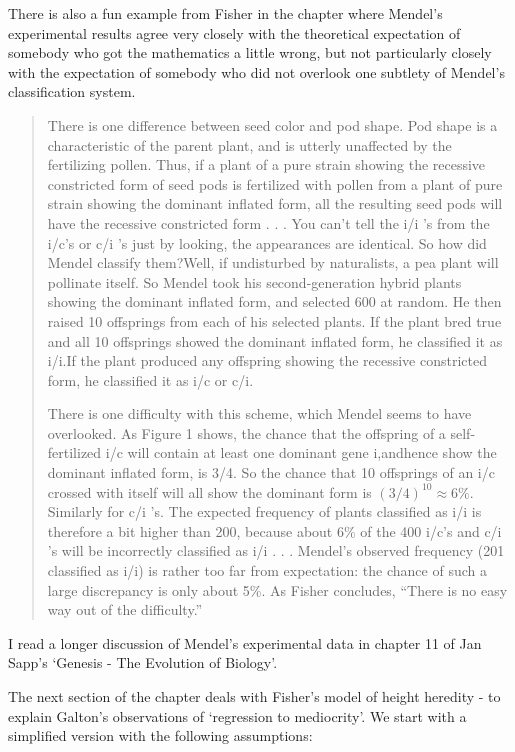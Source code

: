 \documentclass[
]{book}
\begin{document}
There is also a fun example from Fisher in the chapter where Mendel's experimental results agree very closely with the theoretical expectation of somebody who got the mathematics a little wrong, but not particularly closely with the expectation of somebody who did not overlook one subtlety of Mendel's classification system.

\begin{quote}
There is one difference between seed color and pod shape. Pod shape is a characteristic of the parent plant, and is utterly unaffected by the fertilizing pollen. Thus, if a plant of a pure strain showing the recessive constricted form of seed pods is fertilized with pollen from a plant of pure strain showing the dominant inflated form, all the resulting seed pods will have the recessive constricted form . . . You can't tell the i/i 's from the i/c's or c/i 's just by looking, the appearances are identical. So how did Mendel classify them?Well, if undisturbed by naturalists, a pea plant will pollinate itself. So Mendel took his second-generation hybrid plants showing the dominant inflated form, and selected 600 at random. He then raised 10 offsprings from each of his selected plants. If the plant bred true and all 10 offsprings showed the dominant inflated form, he classified it as i/i.If the plant produced any offspring showing the recessive constricted form, he classified it as i/c or c/i.

There is one difficulty with this scheme, which Mendel seems to have overlooked. As Figure 1 shows, the chance that the offspring of a self-fertilized i/c will contain at least one dominant gene i,andhence show the dominant inflated form, is 3/4. So the chance that 10 offsprings of an i/c crossed with itself will all show the dominant form is \((3/4)^{10} \approx 6\%\). Similarly for c/i 's. The expected frequency of plants classified as i/i is therefore a bit higher than 200, because about 6\% of the 400 i/c's and c/i 's will be incorrectly classified as i/i . . . Mendel's observed frequency (201 classified as i/i) is rather too far from expectation: the chance of such a large discrepancy is only about 5\%. As Fisher concludes, ``There is no easy way out of the difficulty.''
\end{quote}

I read a longer discussion of Mendel's experimental data in chapter 11 of Jan Sapp's `Genesis - The Evolution of Biology'.

The next section of the chapter deals with Fisher's model of height heredity - to explain Galton's observations of `regression to mediocrity'. We start with a simplified version with the following assumptions:
\end{document}
